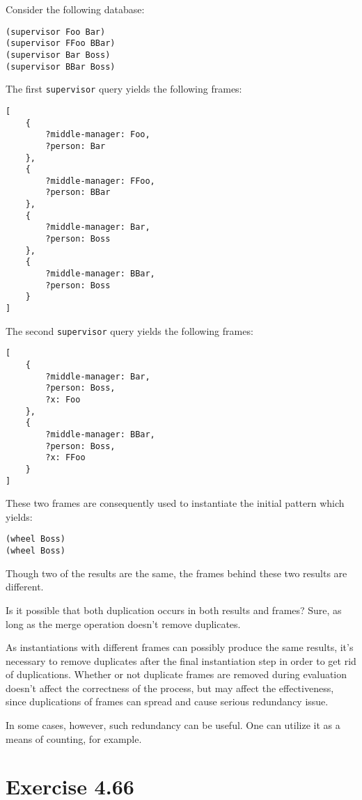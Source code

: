 \documentclass[../main.tex]{subfiles}
\begin{document}
Consider the following database:

\begin{lstlisting}
(supervisor Foo Bar)
(supervisor FFoo BBar)
(supervisor Bar Boss)
(supervisor BBar Boss)
\end{lstlisting}

The first \lstinline{supervisor} query yields the following frames:

\begin{lstlisting}
[
	{
		?middle-manager: Foo,
		?person: Bar
	},
	{
		?middle-manager: FFoo,
		?person: BBar
	},
	{
		?middle-manager: Bar,
		?person: Boss
	},
	{
		?middle-manager: BBar,
		?person: Boss
	}
]
\end{lstlisting}

The second \lstinline{supervisor} query yields the following frames:

\begin{lstlisting}
[
	{
		?middle-manager: Bar,
		?person: Boss,
		?x: Foo
	},
	{
		?middle-manager: BBar,
		?person: Boss,
		?x: FFoo
	}
]
\end{lstlisting}

These two frames are consequently used to instantiate the initial pattern which yields:

\begin{lstlisting}
(wheel Boss)
(wheel Boss)
\end{lstlisting}

Though two of the results are the same, the frames behind these two results are different.

Is it possible that both duplication occurs in both results and frames? Sure, as long as the merge operation doesn't  remove duplicates.

As instantiations with different frames can possibly produce the same results, it's necessary to remove duplicates after the final instantiation step in order to get rid of duplications. Whether or not duplicate frames are removed during evaluation doesn't affect the correctness of the process, but may affect the effectiveness, since duplications of frames can spread and cause serious redundancy issue.

In some cases, however, such redundancy can be useful. One can utilize it as a means of counting, for example.

\section{Exercise 4.66}
\end{document}
